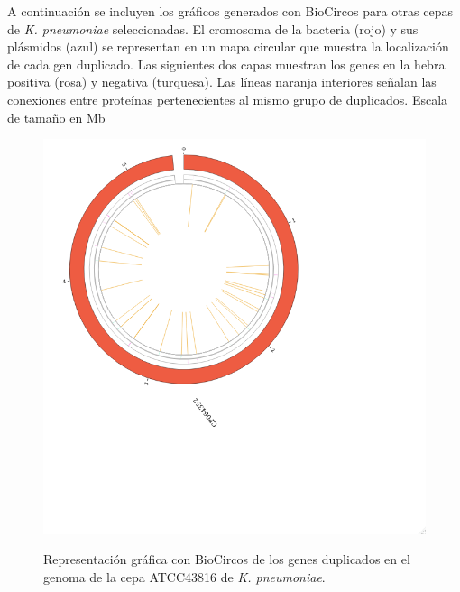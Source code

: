 \newpage
A continuación se incluyen los gráficos generados con BioCircos para otras cepas de \textit{K. pneumoniae} seleccionadas. El cromosoma de la bacteria (rojo) y sus plásmidos (azul) se representan en un mapa circular que muestra la localización de cada gen duplicado. Las siguientes dos capas muestran los genes en la hebra positiva (rosa) y negativa (turquesa). Las líneas naranja interiores señalan las conexiones entre proteínas pertenecientes al mismo grupo de duplicados. Escala de tamaño en Mb

\vspace{10mm}
\begin{figure}[h]
	\centering
	\captionsetup{width=\linewidth}
	\caption[Gráfica biocircos para la cepa ATCC43816 de \textit{K. pneumoniae}]{Representación gráfica con BioCircos de los genes duplicados en el genoma de la cepa ATCC43816 de \textit{K. pneumoniae}.}
	\includegraphics[width=0.8\linewidth]{figs/biocircos_ATCC43816.png}
	\label{fig:bioATCC43816}
\end{figure}

